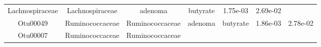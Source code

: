 \documentclass[11pt,]{article}
\begin{document}
\begin{longtable}[]{@{}ccccccc@{}}
\begin{minipage}[t]{0.17\columnwidth}
Lachnospiraceae\strut
\end{minipage} & \begin{minipage}[t]{0.17\columnwidth}\centering\strut
Lachnospiraceae\strut
\end{minipage} & \begin{minipage}[t]{0.09\columnwidth}\centering\strut
adenoma\strut
\end{minipage} & \begin{minipage}[t]{0.11\columnwidth}\centering\strut
butyrate\strut
\end{minipage} & \begin{minipage}[t]{0.09\columnwidth}\centering\strut
1.75e-03\strut
\end{minipage} & \begin{minipage}[t]{0.09\columnwidth}\centering\strut
2.69e-02\strut
\end{minipage}\tabularnewline
\begin{minipage}[t]{0.09\columnwidth}\centering\strut
Otu00049\strut
\end{minipage} & \begin{minipage}[t]{0.17\columnwidth}\centering\strut
Ruminococcaceae\strut
\end{minipage} & \begin{minipage}[t]{0.17\columnwidth}\centering\strut
Ruminococcaceae\strut
\end{minipage} & \begin{minipage}[t]{0.09\columnwidth}\centering\strut
adenoma\strut
\end{minipage} & \begin{minipage}[t]{0.11\columnwidth}\centering\strut
butyrate\strut
\end{minipage} & \begin{minipage}[t]{0.09\columnwidth}\centering\strut
1.86e-03\strut
\end{minipage} & \begin{minipage}[t]{0.09\columnwidth}\centering\strut
2.78e-02\strut
\end{minipage}\tabularnewline
\begin{minipage}[t]{0.09\columnwidth}\centering\strut
Otu00007\strut
\end{minipage} & \begin{minipage}[t]{0.17\columnwidth}\centering\strut
Ruminococcaceae\strut
\end{minipage} & \begin{minipage}[t]{0.17\columnwidth}\centering\strut
Ruminococcaceae\strut
\end{minipage} & \begin{minipage}[t]{0.09\columnwidth}\centering\strut

\end{minipage}
\end{longtable}
\end{document}
